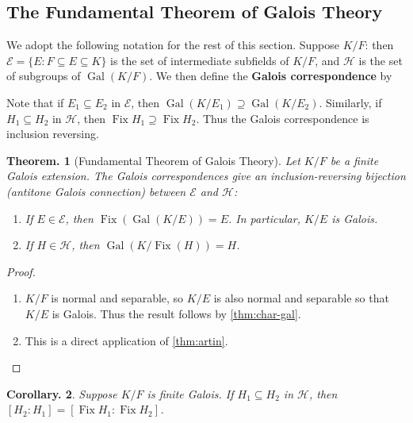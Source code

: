 \documentclass[11pt, a4paper]{memoir}
\newcommand{\mbf}[1]{{\boldmath\bfseries #1}}
\theoremstyle{change}
\newtheorem{theorem}{Theorem.}[section]
\newtheorem{corollary}[theorem]{Corollary.}
\theoremstyle{plain}
\theoremstyle{nonumberplain}
\newtheorem{proof}{Proof}
\DeclareMathOperator{\Fix}{Fix}
\DeclareMathOperator{\Gal}{Gal}
\numberwithin{equation}{section}
\begin{document}
\subsection{The Fundamental Theorem of Galois Theory}
We adopt the following notation for the rest of this section.
Suppose $K/F$: then $\mathcal{E}=\{E:F\subseteq E\subseteq K\}$ is the set of intermediate subfields of $K/F$, and $\mathcal{H}$ is the set of subgroups of $\Gal(K/F)$.
We then define the \mbf{Galois correspondence} by
\begin{center}
\end{center}
Note that if $E_1\subseteq E_2$ in $\mathcal{E}$, then $\Gal(K/E_1)\supseteq\Gal(K/E_2)$.
Similarly, if $H_1\subseteq H_2$ in $\mathcal{H}$, then $\Fix H_1\supseteq\Fix H_2$.
Thus the Galois correspondence is inclusion reversing.
\begin{theorem}[Fundamental Theorem of Galois Theory]\label{thm:ftgt}
    Let $K/F$ be a finite Galois extension.
    The Galois correspondences give an inclusion-reversing bijection (antitone Galois connection) between $\mathcal{E}$ and $\mathcal{H}$:
    \begin{enumerate}[nolistsep]
        \item If $E\in\mathcal{E}$, then $\Fix(\Gal(K/E))=E$.
            In particular, $K/E$ is Galois.
        \item If $H\in\mathcal{H}$, then $\Gal(K/\Fix(H))=H$.
    \end{enumerate}
\end{theorem}
\begin{proof}
    \begin{enumerate}[nl]
        \item $K/F$ is normal and separable, so $K/E$ is also normal and separable so that $K/E$ is Galois.
            Thus the result follows by \cref{thm:char-gal}.
        \item This is a direct application of \cref{thm:artin}.
    \end{enumerate}
\end{proof}
\begin{corollary}
    Suppose $K/F$ is finite Galois.
    If $H_1\subseteq H_2$ in $\mathcal{H}$, then $[H_2:H_1]=[\Fix H_1:\Fix H_2]$.
\end{corollary}
\end{document}
